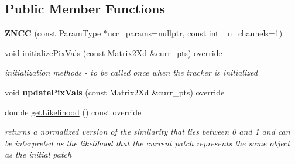 \subsection*{Public Member Functions}
\begin{DoxyCompactItemize}
\item 
\hypertarget{classZNCC_afd60d1487d4c76c3b5202257e8bf39ef}{{\bfseries Z\-N\-C\-C} (const \hyperlink{structZNCCParams}{Param\-Type} $\ast$ncc\-\_\-params=nullptr, const int \-\_\-n\-\_\-channels=1)}\label{classZNCC_afd60d1487d4c76c3b5202257e8bf39ef}

\item 
\hypertarget{classZNCC_abe09bab0ea31e75cac1d863bb7e307e7}{void \hyperlink{classZNCC_abe09bab0ea31e75cac1d863bb7e307e7}{initialize\-Pix\-Vals} (const Matrix2\-Xd \&curr\-\_\-pts) override}\label{classZNCC_abe09bab0ea31e75cac1d863bb7e307e7}

\begin{DoxyCompactList}\small\item\em initialization methods -\/ to be called once when the tracker is initialized \end{DoxyCompactList}\item 
\hypertarget{classZNCC_aeb5bddad423ae9fd530cb583f7187065}{void {\bfseries update\-Pix\-Vals} (const Matrix2\-Xd \&curr\-\_\-pts) override}\label{classZNCC_aeb5bddad423ae9fd530cb583f7187065}

\item 
\hypertarget{classZNCC_a7da812ccf922701ad07b10be977a740e}{double \hyperlink{classZNCC_a7da812ccf922701ad07b10be977a740e}{get\-Likelihood} () const override}\label{classZNCC_a7da812ccf922701ad07b10be977a740e}

\begin{DoxyCompactList}\small\item\em returns a normalized version of the similarity that lies between 0 and 1 and can be interpreted as the likelihood that the current patch represents the same object as the initial patch \end{DoxyCompactList}\end{DoxyCompactItemize}
